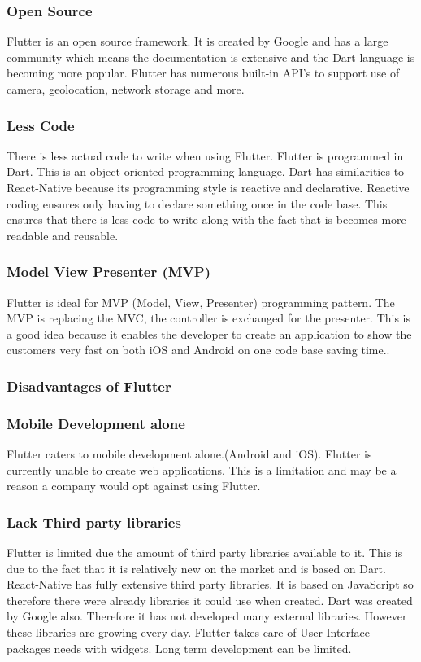 \subsubsection{Open Source}
Flutter is an open source framework. It is created by Google and has a large community which means the documentation is extensive and the Dart language is becoming more popular. Flutter has numerous built-in API's to support use of camera, geolocation, network storage and more.\cite{pros_cons}
\subsubsection{Less Code}
There is less actual code to write when using Flutter. Flutter is programmed in Dart. This is an object oriented programming language. Dart has similarities to React-Native because its programming style is reactive and declarative.\cite{pros_cons} Reactive coding ensures only having to declare something once in the code base. This ensures that there is less code to write along with the fact that is becomes more readable and reusable.\cite{depth_flutter_2019}
\subsubsection{Model View Presenter (MVP)}
Flutter is ideal for MVP (Model, View, Presenter) programming pattern. The MVP is replacing the MVC, the controller is exchanged for the presenter. This is a good idea because it enables the developer to create an application to show the customers very fast on both iOS and Android on one code base saving time.\cite{pros_cons}.

\subsubsection{Disadvantages of Flutter}

\subsubsection{Mobile Development alone}
Flutter caters to mobile development alone.(Android and iOS). Flutter is currently unable to create web applications. This is a limitation and may be a reason a company would opt against using Flutter.

\subsubsection{Lack Third party libraries}
Flutter is limited due the amount of third party libraries available to it. This is due to the fact that it is relatively new on the market and is based on Dart.\cite{pros_cons} React-Native has fully extensive third party libraries. It is based on JavaScript so therefore there were already libraries it could use when created. Dart was created by Google also. Therefore it has not developed many external libraries. However these libraries are growing every day. Flutter takes care of User Interface packages needs with widgets. Long term development can be limited.\cite{good_bad}

